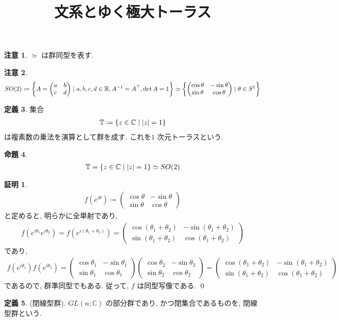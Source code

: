 \documentclass[10pt, fleqn, label-section=none]{bxjsarticle}
\title{文系とゆく極大トーラス}
\date{}
\author{}
\theoremstyle{definition}
\newtheorem{dfn}{定義}[section]
\newtheorem{prop}[dfn]{命題}
\newtheorem*{pf*}{証明}
\newtheorem{remark}[dfn]{注意}
\newcommand{\cbra}[1]{\mleft\{#1\mright\}}
\newcommand{\abs}[1]{\left|#1\right|}
\renewcommand{\;}{\, ; \,}
\newcommand{\gyouretsu}[1]{\begin{pmatrix} #1 \end{pmatrix} }
\begin{document}
\maketitle



\section{}

\begin{remark}
$\simeq $ は群同型を表す. 
\end{remark}


\begin{remark}
\begin{align*} SO(2) \coloneqq \cbra{A =  \gyouretsu{a & b \\ c & d} \mid a,b,c,d \in \mathbb R, A^{-1} = A^\top, \det A = 1} \simeq \cbra{ \gyouretsu{\cos \theta & - \sin \theta \\ \sin \theta & \cos \theta} \mid \theta \in S^1} \end{align*}
\end{remark}

\begin{dfn}集合
\begin{align*} \mathbb T \coloneqq \cbra{z \in \mathbb C \mid \abs z = 1} \end{align*}
は複素数の乗法を演算として群を成す. これを$1$ 次元トーラスという.  
\end{dfn}

\begin{prop}
\begin{align*} \mathbb T = \cbra{z \in \mathbb C \mid \abs z = 1} \simeq SO(2) \end{align*}
\end{prop}
\begin{pf*}
\begin{align*} f(e^{i \theta}) \coloneqq \gyouretsu{\cos \theta & - \sin \theta \\ \sin \theta & \cos \theta}   \end{align*}
と定めると, 明らかに全単射であり, 
\begin{align*} f(e^{i\theta_1} e^{i\theta_2}) = f(e^{i (\theta_1 + \theta_2)}) = \gyouretsu{\cos (\theta_1 + \theta_2) & - \sin(\theta_1 + \theta_2)  \\ \sin(\theta_1 + \theta_2)  & \cos (\theta_1 + \theta_2) }  \end{align*}
であり, 
\begin{align*} f(e^{i\theta_1}) f(e^{i\theta_2}) = \gyouretsu{\cos \theta_1 & - \sin \theta_1 \\ \sin \theta_1 & \cos \theta_1} \gyouretsu{\cos \theta_2 & - \sin \theta_2 \\ \sin \theta_2 & \cos \theta_2}  = \gyouretsu{\cos (\theta_1 + \theta_2) & - \sin(\theta_1 + \theta_2)  \\ \sin(\theta_1 + \theta_2)  & \cos (\theta_1 + \theta_2) }   \end{align*}
であるので, 群準同型でもある.  従って, $f$ は同型写像である.
\qed
\end{pf*}



\begin{dfn}(閉線型群).
$GL(n; \mathbb C)$ の部分群であり, かつ閉集合であるものを, 閉線型群という.
\end{dfn}
\end{document}
